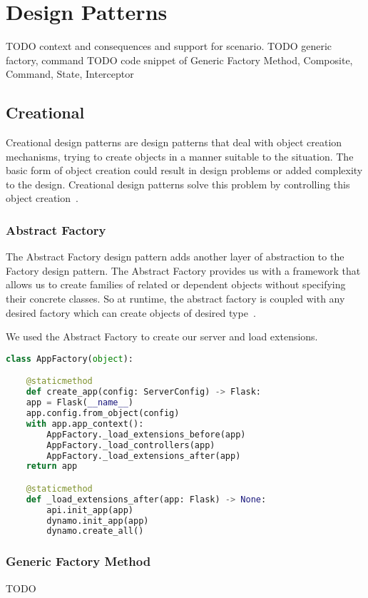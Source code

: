 \chapter{Design Patterns}
TODO context and consequences and support for scenario.
TODO generic factory, command
TODO code snippet of Generic Factory Method, Composite, Command, State, Interceptor

\section{Creational}
Creational design patterns are design patterns that deal with object creation
mechanisms, trying to create objects in a manner suitable to the situation. The basic form of object
creation could result in design problems or added complexity to the design. Creational design patterns
solve this problem by controlling this object creation~\citep{oodesign}.

\subsection{Abstract Factory}
The Abstract Factory design pattern adds another layer of abstraction to the Factory design pattern.
The Abstract Factory provides us with a framework that allows us to create families of related or
dependent objects without specifying their concrete classes. So at runtime, the abstract factory is
coupled with any desired factory which can create objects of desired type~\citep{oodesign}.

We used the Abstract Factory to create our server and load extensions.


\begin{lstlisting}[language=Python]
class AppFactory(object):

	@staticmethod
	def create_app(config: ServerConfig) -> Flask:
	app = Flask(__name__)
	app.config.from_object(config)
	with app.app_context():
		AppFactory._load_extensions_before(app)
		AppFactory._load_controllers(app)
		AppFactory._load_extensions_after(app)
	return app

	@staticmethod
	def _load_extensions_after(app: Flask) -> None:
		api.init_app(app)
		dynamo.init_app(app)
		dynamo.create_all()
\end{lstlisting}


\subsection{Generic Factory Method}
TODO

